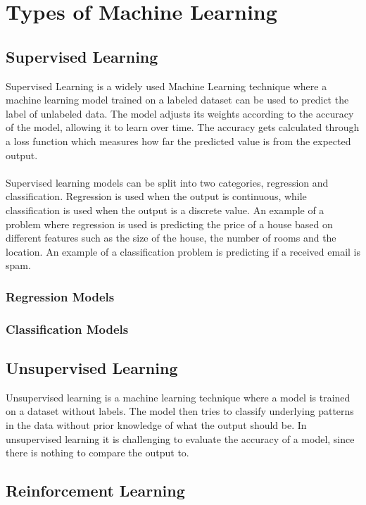 \section{Types of Machine Learning}\label{sec:ml-types}

\subsection{Supervised Learning}\label{sec:supervised-learning}
Supervised Learning is a widely used Machine Learning technique where a machine learning model trained 
on a labeled dataset can be used to predict the label of unlabeled data. The model adjusts its weights 
according to the accuracy of the model, allowing it to learn over time. The accuracy gets calculated through
a loss function which measures how far the predicted value is from the expected output. \cite{ml_supervised_learning}
\\\\
Supervised learning models can be split into two categories, regression and classification. Regression is used when
the output is continuous, while classification is used when the output is a discrete value. An example of a problem
where regression is used is predicting the price of a house based on different features such as the size of the house,
the number of rooms and the location. An example of a classification problem is predicting if a received email is spam. \cite{ml_reg_vs_class}

\subsubsection{Regression Models}\label{sec:regression}

\subsubsection{Classification Models}\label{sec:classification}

\subsection{Unsupervised Learning}\label{sec:unsupervised-learning}
Unsupervised learning is a machine learning technique where a model is trained on a dataset without labels. The model then
tries to classify underlying patterns in the data without prior knowledge of what the output should be. In unsupervised learning
it is challenging to evaluate the accuracy of a model, since there is nothing to compare the output to. 

\subsection{Reinforcement Learning}\label{sec:reinforcement-learning}
